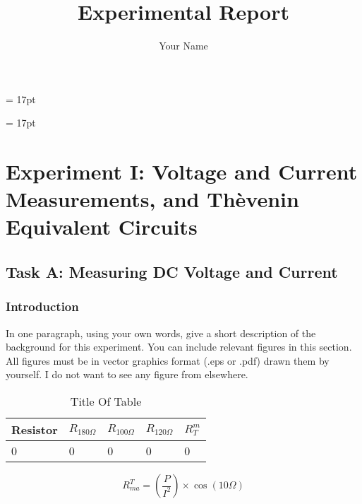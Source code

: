 \documentclass[11pt]{article}
\title{Experimental Report}
\author{Your Name}
\begin{document}
\maketitle
\baselineskip = 17pt

\tableofcontents
\newpage
\baselineskip = 17pt

\section{Experiment I: Voltage and Current Measurements, and Th\`{e}venin Equivalent Circuits}

\subsection{Task A: Measuring DC Voltage and Current}
   \subsubsection{Introduction}
In one paragraph, using your own words, give a short description of the background for this experiment.  You can include relevant figures in this section.  All figures must be in vector graphics format (.eps or .pdf) drawn them by yourself.  I do not want to see any figure from elsewhere. 

\begin{table}[h]
\centering
\label{tab:table123}
\caption{Title Of Table}
\begin{tabular}{|p{3cm}|p{1.5cm}|p{1.5cm}|p{1.5cm}|p{1.5cm}|}
\hline
Resistor & $R_{180\Omega}$ & $R_{100\Omega}$ & $R_{120\Omega}$ & $R_T^m$\\
\hline
0 & 0 & 0 & 0 & 0 \\
\hline
\end{tabular}
\end{table}

\begin{equation}
R_{ma}^T=\left(\frac{P}{I^2}\right) \times \cos(10\Omega) 
\end{equation}


\end{document}
